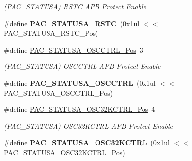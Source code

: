 \begin{DoxyCompactItemize}
\begin{DoxyCompactList}\small\item\em (P\+A\+C\+\_\+\+S\+T\+A\+T\+U\+S\+A) R\+S\+T\+C A\+P\+B Protect Enable \end{DoxyCompactList}\item 
\hypertarget{group___s_a_m_l21___p_a_c_gaf6acf147fe143bb7a8f24d4c59fde61e}{}\#define {\bfseries P\+A\+C\+\_\+\+S\+T\+A\+T\+U\+S\+A\+\_\+\+R\+S\+T\+C}~(0x1ul $<$$<$ P\+A\+C\+\_\+\+S\+T\+A\+T\+U\+S\+A\+\_\+\+R\+S\+T\+C\+\_\+\+Pos)\label{group___s_a_m_l21___p_a_c_gaf6acf147fe143bb7a8f24d4c59fde61e}

\item 
\hypertarget{group___s_a_m_l21___p_a_c_gac28b45c8a797fc8f3ec4a3727441faa1}{}\#define \hyperlink{group___s_a_m_l21___p_a_c_gac28b45c8a797fc8f3ec4a3727441faa1}{P\+A\+C\+\_\+\+S\+T\+A\+T\+U\+S\+A\+\_\+\+O\+S\+C\+C\+T\+R\+L\+\_\+\+Pos}~3\label{group___s_a_m_l21___p_a_c_gac28b45c8a797fc8f3ec4a3727441faa1}

\begin{DoxyCompactList}\small\item\em (P\+A\+C\+\_\+\+S\+T\+A\+T\+U\+S\+A) O\+S\+C\+C\+T\+R\+L A\+P\+B Protect Enable \end{DoxyCompactList}\item 
\hypertarget{group___s_a_m_l21___p_a_c_gae44bba09bbe7b75a8ce6bea41f0a6ca3}{}\#define {\bfseries P\+A\+C\+\_\+\+S\+T\+A\+T\+U\+S\+A\+\_\+\+O\+S\+C\+C\+T\+R\+L}~(0x1ul $<$$<$ P\+A\+C\+\_\+\+S\+T\+A\+T\+U\+S\+A\+\_\+\+O\+S\+C\+C\+T\+R\+L\+\_\+\+Pos)\label{group___s_a_m_l21___p_a_c_gae44bba09bbe7b75a8ce6bea41f0a6ca3}

\item 
\hypertarget{group___s_a_m_l21___p_a_c_gac6bf26d952a01ac692e8542aac25052d}{}\#define \hyperlink{group___s_a_m_l21___p_a_c_gac6bf26d952a01ac692e8542aac25052d}{P\+A\+C\+\_\+\+S\+T\+A\+T\+U\+S\+A\+\_\+\+O\+S\+C32\+K\+C\+T\+R\+L\+\_\+\+Pos}~4\label{group___s_a_m_l21___p_a_c_gac6bf26d952a01ac692e8542aac25052d}

\begin{DoxyCompactList}\small\item\em (P\+A\+C\+\_\+\+S\+T\+A\+T\+U\+S\+A) O\+S\+C32\+K\+C\+T\+R\+L A\+P\+B Protect Enable \end{DoxyCompactList}\item 
\hypertarget{group___s_a_m_l21___p_a_c_ga10e4386e24746ea06db7d9efd0d0e637}{}\#define {\bfseries P\+A\+C\+\_\+\+S\+T\+A\+T\+U\+S\+A\+\_\+\+O\+S\+C32\+K\+C\+T\+R\+L}~(0x1ul $<$$<$ P\+A\+C\+\_\+\+S\+T\+A\+T\+U\+S\+A\+\_\+\+O\+S\+C32\+K\+C\+T\+R\+L\+\_\+\+Pos)\label{group___s_a_m_l21___p_a_c_ga10e4386e24746ea06db7d9efd0d0e637}


\end{DoxyCompactItemize}
